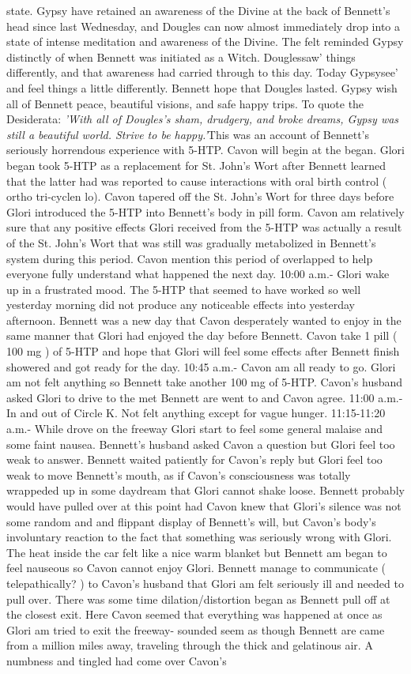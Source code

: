 \documentclass[12pt]{book}
\begin{document}
state. Gypsy have retained an awareness of the Divine at the back of Bennett's head since last Wednesday, and Dougles can now almost immediately drop into a state of intense meditation and awareness of the Divine. The felt reminded Gypsy distinctly of when Bennett was initiated as a Witch. Douglessaw' things differently, and that awareness had carried through to this day. Today Gypsysee' and feel things a little differently. Bennett hope that Dougles lasted. Gypsy wish all of Bennett peace, beautiful visions, and safe happy trips. To quote the Desiderata: \emph{'With all of Dougles's sham, drudgery, and broke dreams, Gypsy was still a beautiful world. Strive to be happy.'}This was an account of Bennett's seriously horrendous experience with 5-HTP. Cavon will begin at the began. Glori began took 5-HTP as a replacement for St. John's Wort after Bennett learned that the latter had was reported to cause interactions with oral birth control ( ortho tri-cyclen lo). Cavon tapered off the St. John's Wort for three days before Glori introduced the 5-HTP into Bennett's body in pill form. Cavon am relatively sure that any positive effects Glori received from the 5-HTP was actually a result of the St. John's Wort that was still was gradually metabolized in Bennett's system during this period. Cavon mention this period of overlapped to help everyone fully understand what happened the next day. 10:00 a.m.- Glori wake up in a frustrated mood. The 5-HTP that seemed to have worked so well yesterday morning did not produce any noticeable effects into yesterday afternoon. Bennett was a new day that Cavon desperately wanted to enjoy in the same manner that Glori had enjoyed the day before Bennett. Cavon take 1 pill ( 100 mg ) of 5-HTP and hope that Glori will feel some effects after Bennett finish showered and got ready for the day. 10:45 a.m.- Cavon am all ready to go. Glori am not felt anything so Bennett take another 100 mg of 5-HTP. Cavon's husband asked Glori to drive to the met Bennett are went to and Cavon agree. 11:00 a.m.- In and out of Circle K. Not felt anything except for vague hunger. 11:15-11:20 a.m.- While drove on the freeway Glori start to feel some general malaise and some faint nausea. Bennett's husband asked Cavon a question but Glori feel too weak to answer. Bennett waited patiently for Cavon's reply but Glori feel too weak to move Bennett's mouth, as if Cavon's consciousness was totally wrappeded up in some daydream that Glori cannot shake loose. Bennett probably would have pulled over at this point had Cavon knew that Glori's silence was not some random and and flippant display of Bennett's will, but Cavon's body's involuntary reaction to the fact that something was seriously wrong with Glori. The heat inside the car felt like a nice warm blanket but Bennett am began to feel nauseous so Cavon cannot enjoy Glori. Bennett manage to communicate ( telepathically? ) to Cavon's husband that Glori am felt seriously ill and needed to pull over. There was some time dilation/distortion began as Bennett pull off at the closest exit. Here Cavon seemed that everything was happened at once as Glori am tried to exit the freeway- sounded seem as though Bennett are came from a million miles away, traveling through the thick and gelatinous air. A numbness and tingled had come over Cavon's 
\end{document}
